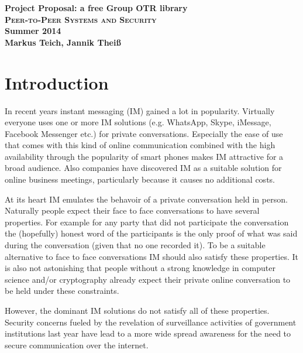 

\title{}
\author{Markus Teich, Jannik Theiß}
\date{\today}



\begin{center}
\huge \textbf{Project Proposal: a free Group OTR library} \\
\vspace{2cm}
\LARGE\textbf{\textsc{Peer-to-Peer Systems and Security}}\\
\vspace{0.5cm}
\textbf{Summer 2014}\\
\textbf{Markus Teich, Jannik Theiß}
\vspace{3.5cm}
\end{center}


\section{Introduction}
In recent years instant messaging (IM) gained a lot in popularity. Virtually everyone uses one or more IM solutions (e.g. WhatsApp, Skype, iMessage, Facebook Messenger etc.) for private conversations. Especially the ease of use that comes with this kind of online communication combined with the high availability through the popularity of smart phones makes IM attractive for a broad audience. Also companies have discovered IM as a suitable solution for online business meetings, particularly because it causes no additional costs.

At its heart IM emulates the behavoir of a private conversation held in person. Naturally people expect their face to face conversations to have several properties. For example for any party that did not participate the conversation the (hopefully) honest word of the participants is the only proof of what was said during the conversation (given that no one recorded it). To be a suitable alternative to face to face conversations IM should also satisfy these properties. It is also not astonishing that people without a strong knowledge in computer science and/or cryptography already expect their private online conversation to be held under these constraints.


However, the dominant IM solutions do not satisfy all of these properties. Security concerns fueled by the revelation of surveillance activities of government institutions last year have lead to a more wide spread awareness for the need to secure communication over the internet.



